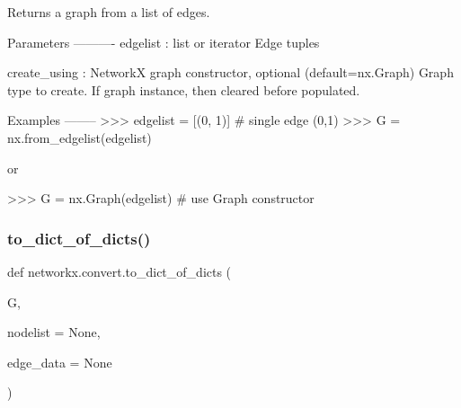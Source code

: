\begin{DoxyVerb}Returns a graph from a list of edges.

Parameters
----------
edgelist : list or iterator
  Edge tuples

create_using : NetworkX graph constructor, optional (default=nx.Graph)
    Graph type to create. If graph instance, then cleared before populated.

Examples
--------
>>> edgelist = [(0, 1)]  # single edge (0,1)
>>> G = nx.from_edgelist(edgelist)

or

>>> G = nx.Graph(edgelist)  # use Graph constructor\end{DoxyVerb}
 \mbox{\label{namespacenetworkx_1_1convert_a716491bc042d88d9668279ceb4a39900}} 
\subsubsection{\texorpdfstring{to\+\_\+dict\+\_\+of\+\_\+dicts()}{to\_dict\_of\_dicts()}}
{\footnotesize\ttfamily def networkx.\+convert.\+to\+\_\+dict\+\_\+of\+\_\+dicts (\begin{DoxyParamCaption}\item[{}]{G,  }\item[{}]{nodelist = {\ttfamily None},  }\item[{}]{edge\+\_\+data = {\ttfamily None} }\end{DoxyParamCaption})}

